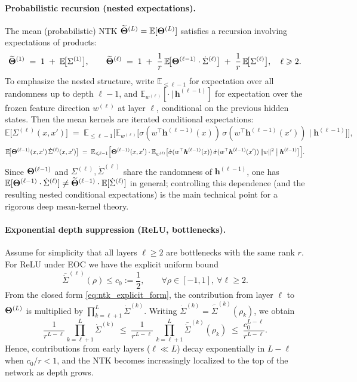 \paragraph{Probabilistic recursion (nested expectations).}
The mean (probabilistic) NTK \( \widetilde{\boldsymbol{\Theta}}^{(L)}=\mathbb{E}[\boldsymbol{\Theta}^{(L)}] \) satisfies a recursion involving expectations of products:
\begin{equation}
\label{eq:mean_ntk_recursion}
\widetilde{\boldsymbol{\Theta}}^{(1)} \;=\; 1 \;+\; \mathbb{E}\!\big[\Sigma^{(1)}\big],\qquad
\widetilde{\boldsymbol{\Theta}}^{(\ell)} \;=\; 1 \;+\; \frac{1}{r}\,\mathbb{E}\!\big[\boldsymbol{\Theta}^{(\ell-1)}\cdot\dot{\Sigma}^{(\ell)}\big] \;+\; \frac{1}{r}\,\mathbb{E}\!\big[\Sigma^{(\ell)}\big],\quad \ell \geqslant 2.
\end{equation}
To emphasize the nested structure, write \(\mathbb{E}_{\le \ell-1}\) for expectation over all randomness up to depth \(\ell-1\), and \(\mathbb{E}_{w^{(\ell)}}[\cdot\,|\,\bm{h}^{(\ell-1)}]\) for expectation over the frozen feature direction \(w^{(\ell)}\) at layer \(\ell\), conditional on the previous hidden states. Then the mean kernels are iterated conditional expectations:
\[
\mathbb{E}\!\big[\Sigma^{(\ell)}(x,x')\big]
\;=\;
\mathbb{E}_{\le \ell-1}\Big[
\mathbb{E}_{w^{(\ell)}}\big[\sigma(w^{\top}\bm{h}^{(\ell-1)}(x))\,\sigma(w^{\top}\bm{h}^{(\ell-1)}(x'))\;\big|\;\bm{h}^{(\ell-1)}\big]
\Big],
\]
\[
\mathbb{E}\!\big[\boldsymbol{\Theta}^{(\ell-1)}(x,x')\,\dot{\Sigma}^{(\ell)}(x,x')\big]
\;=\;
\mathbb{E}_{\leqslant \ell-1}\Big[
\boldsymbol{\Theta}^{(\ell-1)}(x,x')\cdot
\mathbb{E}_{w^{(\ell)}}\big[\dot{\sigma}(w^{\top}\bm{h}^{(\ell-1)}(x))\,\dot{\sigma}(w^{\top}\bm{h}^{(\ell-1)}(x'))\,\|w\|^2\;\big|\;\bm{h}^{(\ell-1)}\big]
\Big].
\]
Since \( \boldsymbol{\Theta}^{(\ell-1)} \) and \( \Sigma^{(\ell)},\dot{\Sigma}^{(\ell)} \) share the randomness of \( \bm{h}^{(\ell-1)} \), one has \( \mathbb{E}[\boldsymbol{\Theta}^{(\ell-1)}\cdot\dot{\Sigma}^{(\ell)}] \neq \widetilde{\boldsymbol{\Theta}}^{(\ell-1)}\cdot\mathbb{E}[\dot{\Sigma}^{(\ell)}] \) in general; controlling this dependence (and the resulting nested conditional expectations) is the main technical point for a rigorous deep mean-kernel theory.

\paragraph{Exponential depth suppression (ReLU, bottlenecks).}
Assume for simplicity that all layers \(\ell\ge 2\) are bottlenecks with the same rank \(r\). For ReLU under EOC we have the explicit uniform bound
\[
\bar{\dot{\Sigma}}^{(\ell)}(\rho)\le c_0:=\frac12,\qquad \forall \rho\in[-1,1],\ \forall \ell\ge 2.
\]
From the closed form \eqref{eq:ntk_explicit_form}, the contribution from layer \(\ell\) to \(\boldsymbol{\Theta}^{(L)}\) is multiplied by \(\prod_{k=\ell+1}^{L}\dot{\Sigma}^{(k)}\). Writing \(\dot{\Sigma}^{(k)}=\bar{\dot{\Sigma}}^{(k)}(\rho_k)\), we obtain
\[
\frac{1}{r^{L-\ell}}\prod_{k=\ell+1}^{L}\dot{\Sigma}^{(k)}
\;\le\;
\frac{1}{r^{L-\ell}}\,\prod_{k=\ell+1}^{L}\bar{\dot{\Sigma}}^{(k)}(\rho_k)
\;\le\;\frac{c_0^{L-\ell}}{r^{L-\ell}}.
\]
Hence, contributions from early layers (\(\ell\ll L\)) decay exponentially in \(L-\ell\) when \(c_0/r<1\), and the NTK becomes increasingly localized to the top of the network as depth grows.


